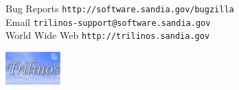 \documentclass[11pt,twoside,titlepage]{TrilinosDoc}
\begin{document}
\label{Contacts}
Bug Reports \hfill \texttt{http://software.sandia.gov/bugzilla} \\
Email \hfill \texttt{trilinos-support@software.sandia.gov} \\
World Wide Web \hfill \texttt{http://trilinos.sandia.gov}

\vspace*{\fill}
\includegraphics[height=0.5in]{trilinos.eps}
\hfill

\cleardoublepage
\tableofcontents

\cleardoublepage
\listoffigures

\cleardoublepage
\listoftables

\clearpage

%

\cleardoublepage
%
%

\cleardoublepage
\printindex
%
\end{document}

